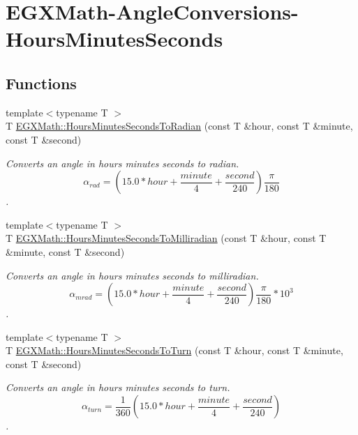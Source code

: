\hypertarget{group___e_g_x_math-_angle_conversions-_hours_minutes_seconds}{}\section{E\+G\+X\+Math-\/\+Angle\+Conversions-\/\+Hours\+Minutes\+Seconds}
\label{group___e_g_x_math-_angle_conversions-_hours_minutes_seconds}
\subsection*{Functions}
\begin{DoxyCompactItemize}
\item 
{\footnotesize template$<$typename T $>$ }\\T \mbox{\hyperlink{group___e_g_x_math-_angle_conversions-_hours_minutes_seconds_gaa0b04e9012ec739df1464298971e3be7}{E\+G\+X\+Math\+::\+Hours\+Minutes\+Seconds\+To\+Radian}} (const T \&hour, const T \&minute, const T \&second)
\begin{DoxyCompactList}\small\item\em Converts an angle in hours minutes seconds to radian. \[\alpha_{rad}=(15.0 * hour + \frac{minute}{4} + \frac{second}{240})\frac{\pi}{180}\]. \end{DoxyCompactList}\item 
{\footnotesize template$<$typename T $>$ }\\T \mbox{\hyperlink{group___e_g_x_math-_angle_conversions-_hours_minutes_seconds_gad78a90abaed52ca9d5fe6b4287c4a5f3}{E\+G\+X\+Math\+::\+Hours\+Minutes\+Seconds\+To\+Milliradian}} (const T \&hour, const T \&minute, const T \&second)
\begin{DoxyCompactList}\small\item\em Converts an angle in hours minutes seconds to milliradian. \[\alpha_{mrad}=(15.0 * hour + \frac{minute}{4} + \frac{second}{240})\frac{\pi}{180}*10^3\]. \end{DoxyCompactList}\item 
{\footnotesize template$<$typename T $>$ }\\T \mbox{\hyperlink{group___e_g_x_math-_angle_conversions-_hours_minutes_seconds_ga68050282994968cd6f80a396f6a539ae}{E\+G\+X\+Math\+::\+Hours\+Minutes\+Seconds\+To\+Turn}} (const T \&hour, const T \&minute, const T \&second)
\begin{DoxyCompactList}\small\item\em Converts an angle in hours minutes seconds to turn. \[\alpha_{turn}=\frac{1}{360}(15.0 * hour + \frac{minute}{4} + \frac{second}{240})\]. \end{DoxyCompactList}\item 

\end{DoxyCompactItemize}

